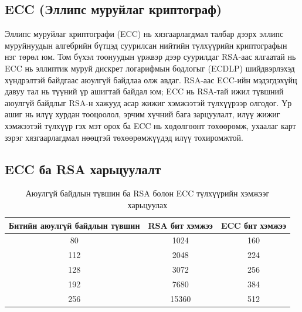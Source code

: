 \subsection{ECC (Эллипс муруйлаг криптограф)}

Эллипс муруйлаг криптографи (ECC) нь хязгаарлагдмал талбар дээрх эллипс муруйнуудын алгебрийн бүтцэд суурилсан нийтийн түлхүүрийн криптографын нэг төрөл юм. Том бүхэл тоонуудын үржвэр дээр суурилдаг RSA-аас ялгаатай нь ECC нь эллиптик муруй дискрет логарифмын бодлогыг (ECDLP) шийдвэрлэхэд хүндрэлтэй байдгаас аюулгүй байдлаа олж авдаг. RSA-аас ECC-ийн мэдэгдэхүйц давуу тал нь түүний үр ашигтай байдал юм; ECC нь RSA-тай ижил түвшний аюулгүй байдлыг RSA-н хажууд асар жижиг хэмжээтэй түлхүүрээр олгодог. Үр ашиг нь илүү хурдан тооцоолол, эрчим хүчний бага зарцуулалт, илүү жижиг хэмжээтэй түлхүүр гэх мэт орох ба ECC нь хөдөлгөөнт төхөөрөмж, ухаалаг карт зэрэг хязгаарлагдмал нөөцтэй төхөөрөмжүүдэд илүү тохиромжтой.
\subsection{ECC ба RSA харьцуулалт}
\begin{table}[h]
	\centering
	\begin{tabular}{|c|c|c|}
		\hline
		\textbf{Битийн аюулгүй байдлын түвшин} & \textbf{RSA бит хэмжээ} & \textbf{ECC бит хэмжээ} \\ \hline
		80                                     & 1024                    & 160                     \\ \hline
		112                                    & 2048                    & 224                     \\ \hline
		128                                    & 3072                    & 256                     \\ \hline
		192                                    & 7680                    & 384                     \\ \hline
		256                                    & 15360                   & 512                     \\ \hline
	\end{tabular}
	\caption{Аюулгүй байдлын түвшин ба RSA болон ECC түлхүүрийн хэмжээг харьцуулах \cite{RSAvsECC}}
	\label{tab:rsa_ecc_key_sizes}
\end{table}

